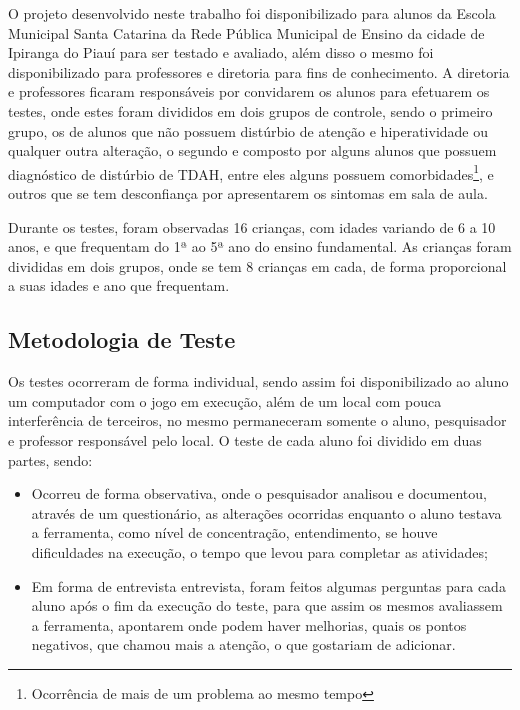 \documentclass[
	12pt,				%
    oneside,			%
	a4paper,			%
	english,			%
	french,				%
	spanish,			%
	brazil,				%
	]{abntex2}
\begin{document}
	O projeto desenvolvido neste trabalho foi disponibilizado para alunos da Escola Municipal Santa Catarina da Rede Pública Municipal de Ensino da cidade de Ipiranga do Piauí para ser testado e avaliado, além disso o mesmo foi disponibilizado para professores e diretoria para fins de conhecimento. A diretoria e professores ficaram responsáveis por convidarem os alunos para efetuarem os testes, onde estes foram divididos em dois grupos de controle, sendo o primeiro grupo, os de alunos que não possuem distúrbio de atenção e hiperatividade ou qualquer outra alteração, o segundo e composto por alguns alunos que possuem diagnóstico de distúrbio de TDAH, entre eles alguns possuem comorbidades\footnote{Ocorrência de mais de um problema ao mesmo tempo}, e outros que se tem desconfiança por apresentarem os sintomas em sala de aula.
	
	Durante os testes, foram observadas 16 crianças, com idades variando de 6 a 10 anos, e que frequentam do 1ª ao 5ª ano do ensino fundamental. As crianças foram divididas em dois grupos, onde se tem 8 crianças em cada, de forma proporcional a suas idades e ano que frequentam. 
	
	\subsection{Metodologia de Teste}
		Os testes ocorreram de forma individual, sendo assim foi disponibilizado ao aluno um computador com o jogo em execução, além de um local com pouca interferência de terceiros, no mesmo permaneceram somente o aluno, pesquisador e professor responsável pelo local. O teste de cada aluno foi dividido em duas partes, sendo:
		
			\begin{itemize}
				\item Ocorreu de forma observativa, onde o pesquisador analisou e documentou, através de um questionário, as alterações ocorridas enquanto o aluno testava a ferramenta, como nível de concentração, entendimento, se houve dificuldades na execução, o tempo que levou para completar as atividades;
				
				\item Em forma de entrevista entrevista, foram feitos algumas perguntas para cada aluno após o fim da execução do teste, para que assim os mesmos avaliassem a ferramenta, apontarem onde podem haver melhorias, quais os pontos negativos, que chamou mais a atenção, o que gostariam de adicionar.
			\end{itemize}
		
\end{document}
